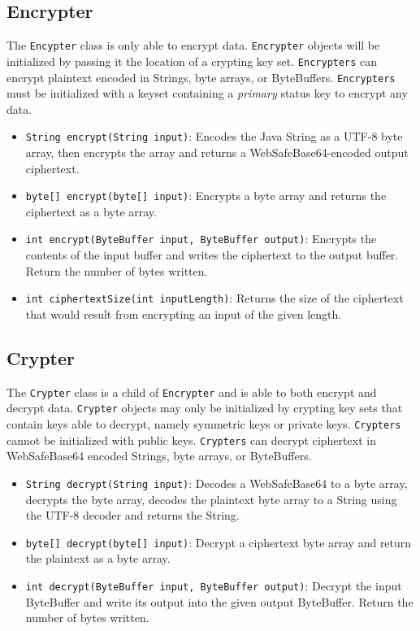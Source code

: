 \documentclass{llncs}
\begin{document}
\subsection{Encrypter}

The {\tt Encypter} class is only able to encrypt data. {\tt Encrypter}
objects will be initialized by passing it the location of a crypting
key set.  {\tt Encrypters} can encrypt plaintext encoded in Strings,
byte arrays, or ByteBuffers. {\tt Encrypters} must be initialized with
a keyset containing a {\it primary} status key to encrypt any data.

\begin{itemize}

\item {\tt String encrypt(String input)}: Encodes the Java String as a
  UTF-8 byte array, then encrypts the array and returns a
  WebSafeBase64-encoded output ciphertext.

\item {\tt byte[] encrypt(byte[] input)}: Encrypts a byte array and
  returns the ciphertext as a byte array.

\item {\tt int encrypt(ByteBuffer input, ByteBuffer output)}: Encrypts
  the contents of the input buffer and writes the ciphertext to the
  output buffer. Return the number of bytes written.

\item {\tt int ciphertextSize(int inputLength)}: Returns the size of
  the ciphertext that would result from encrypting an input of the
  given length.

\end{itemize}

\subsection{Crypter}

The {\tt Crypter} class is a child of {\tt Encrypter} and is able to
both encrypt and decrypt data. {\tt Crypter} objects may only be
initialized by crypting key sets that contain keys able to decrypt,
namely symmetric keys or private keys. {\tt Crypters} cannot be
initialized with public keys. {\tt Crypters} can decrypt ciphertext in
WebSafeBase64 encoded Strings, byte arrays, or ByteBuffers.

\begin{itemize}

\item {\tt String decrypt(String input)}: Decodes a WebSafeBase64 to a
  byte array, decrypts the byte array, decodes the plaintext byte
  array to a String using the UTF-8 decoder and returns the String.

\item {\tt byte[] decrypt(byte[] input)}: Decrypt a ciphertext byte
  array and return the plaintext as a byte array.

\item {\tt int decrypt(ByteBuffer input, ByteBuffer output)}: Decrypt
  the input ByteBuffer and write its output into the given output
  ByteBuffer.  Return the number of bytes written.

\end{itemize}
\end{document}
